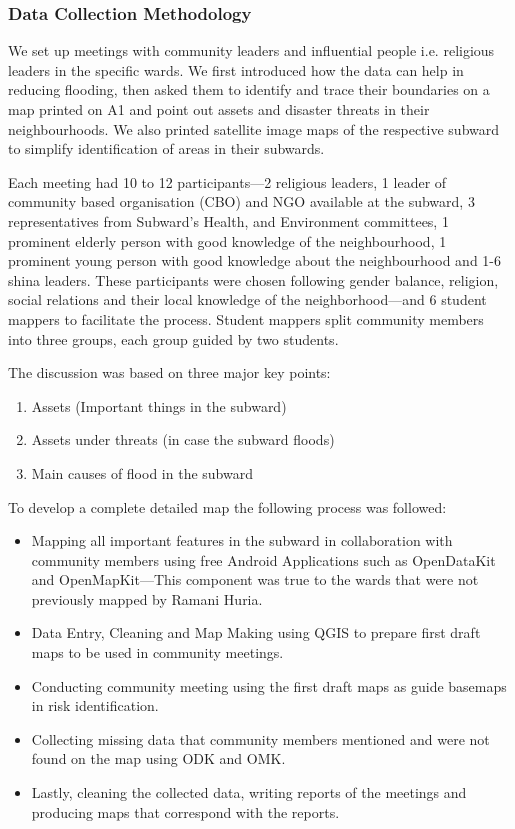 \documentclass[a4paper,12pt,twoside]{article}
\begin{document}
\subsubsection{Data Collection Methodology}
We set up meetings with community leaders and influential people i.e. religious leaders in the specific wards. We first introduced how the data can help in reducing flooding, then asked them to identify and trace their boundaries on a map printed on A1 and point out assets and disaster threats in their neighbourhoods. We also printed satellite image maps of the respective subward to simplify identification of areas in their subwards.

Each meeting had 10 to 12 participants---2 religious leaders, 1 leader of community based organisation (CBO) and NGO available at the subward, 3 representatives from Subward’s Health, and Environment committees, 1 prominent elderly person with good knowledge of the neighbourhood, 1 prominent young person with good knowledge about the neighbourhood and 1-6 shina leaders. These participants were chosen following gender balance, religion, social relations and their local knowledge of the neighborhood---and 6 student mappers to facilitate the process. Student mappers split community members into three groups, each group guided by two students.

The discussion was based on three major key points:
\begin{enumerate}
    \item Assets (Important things in the subward)
    \item Assets under threats (in case the subward floods)
    \item Main causes of flood in the subward
\end{enumerate}

To develop a complete detailed map the following process was followed:
\begin{itemize}
    \item Mapping all important features in the subward in collaboration with community members using free Android Applications such as OpenDataKit and OpenMapKit---This component was true to the wards that were not previously mapped by Ramani Huria.
    \item Data Entry, Cleaning and Map Making using QGIS to prepare first draft maps to be used in community meetings.
    \item Conducting community meeting using the first draft maps as guide basemaps in risk identification.
    \item Collecting missing data that community members mentioned and were not found on the map using ODK and OMK.
    \item Lastly, cleaning the collected data, writing reports of the meetings and producing maps that correspond with the reports.
\end{itemize}
\end{document}
